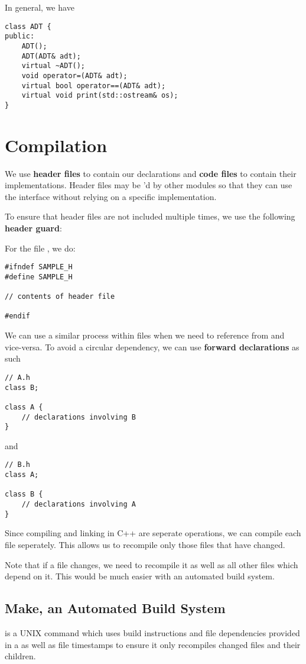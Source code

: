 \documentclass[12pt]{article}
\begin{document}
In general, we have
\begin{verbatim}
class ADT {
public:
    ADT();
    ADT(ADT& adt);
    virtual ~ADT();
    void operator=(ADT& adt);
    virtual bool operator==(ADT& adt);
    virtual void print(std::ostream& os);
}
\end{verbatim}

\section{Compilation}
We use {\bf header files} to contain our declarations and {\bf code files} to contain their implementations. Header files may be 'd by other modules so that they can use the interface without relying on a specific implementation.

To ensure that header files are not included multiple times, we use the following {\bf header guard}:

For the file , we do:
\begin{verbatim}
#ifndef SAMPLE_H
#define SAMPLE_H

// contents of header file

#endif
\end{verbatim}

We can use a similar process within files when we need to reference  from  and vice-versa. To avoid a circular dependency, we can use {\bf forward declarations} as such
\begin{verbatim}
// A.h
class B;

class A {
    // declarations involving B
}
\end{verbatim}
and
\begin{verbatim}
// B.h
class A;

class B {
    // declarations involving A
}
\end{verbatim}

Since compiling and linking in C++ are seperate operations, we can compile each file seperately. This allows us to recompile only those files that have changed.

Note that if a file changes, we need to recompile it as well as all other files which depend on it. This would be much easier with an automated build system.

\subsection{Make, an Automated Build System}
 is a UNIX command which uses build instructions and file dependencies provided in a  as well as file timestamps to ensure it only recompiles changed files and their children.
\end{document}
